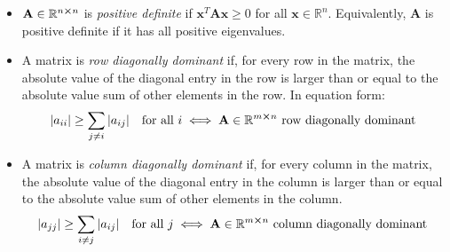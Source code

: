 \documentclass[11pt, a4paper]{article}
\newcommand{\R}{\mathbb{R}} %
\newcommand{\mat}[1]{\mathbf{#1}} %
\begin{document}
\begin{itemize}
\begin{itemize}
		\item  $ \mat{A} \in \R^{n \cross n} $ is \textit{positive definite} if $ \bm{x}^{T} \mat{A} \bm{x} \geq 0 $ for all $ \bm{x} \in \R^{n} $. Equivalently, $ \mat{A} $ is positive definite if it has all positive eigenvalues.
		
		\item A matrix is \textit{row diagonally dominant} if, for every row in the matrix, the absolute value of the diagonal entry in the row is larger than or equal to the absolute value sum of other elements in the row. In equation form:
		\begin{equation*}
			\abs{a_{ii}} \geq \sum_{j \neq i} \abs{a_{ij}} \quad \text{for all } i \iff 	\mat{A} \in \R^{m \cross n} \text{ row diagonally dominant } 
		\end{equation*}
				
		\item A matrix is \textit{column diagonally dominant} if, for every column in the matrix, the absolute value of the diagonal entry in the column is larger than or equal to the absolute value sum of other elements in the column. 
		\begin{equation*}
	 		\abs{a_{jj}} \geq \sum_{i \neq j} \abs{a_{ij}} \quad \text{for all } j \iff 	\mat{A} \in \R^{m\cross n} \text{ column diagonally dominant } 
		\end{equation*}

	\end{itemize}

	
	
\end{itemize}
\end{document}
